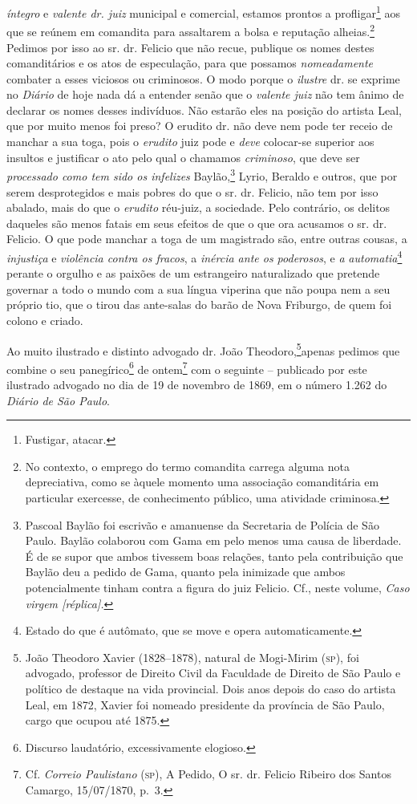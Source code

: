 \emph{íntegro} e \emph{valente dr. juiz} municipal e comercial, estamos
prontos a profligar\footnote{ Fustigar, atacar.} aos que se reúnem em
comandita para assaltarem a bolsa e reputação alheias.\footnote{ No
  contexto, o emprego do termo comandita carrega alguma nota
  depreciativa, como se àquele momento uma associação comanditária em
  particular exercesse, de conhecimento público, uma atividade
  criminosa.} Pedimos por isso ao sr. dr. Felicio que não recue,
publique os nomes destes comanditários e os atos de especulação, para
que possamos \emph{nomeadamente} combater a esses viciosos ou
criminosos. O modo porque o \emph{ilustre} dr. se exprime no
\emph{Diário} de hoje nada dá a entender senão que o \emph{valente juiz}
não tem ânimo de declarar os nomes desses indivíduos. Não estarão eles
na posição do artista Leal, que por muito menos foi preso? O erudito dr.
não deve nem pode ter receio de manchar a sua toga, pois o
\emph{erudito} juiz pode e \emph{deve} colocar-se superior aos insultos
e justificar o ato pelo qual o chamamos \emph{criminoso}, que deve ser
\emph{processado como tem sido os infelizes} Baylão,\footnote{ Pascoal
  Baylão foi escrivão e amanuense da Secretaria de Polícia de São Paulo.
  Baylão colaborou com Gama em pelo menos uma causa de liberdade. É de
  se supor que ambos tivessem boas relações, tanto pela contribuição que
  Baylão deu a pedido de Gama, quanto pela inimizade que ambos
  potencialmente tinham contra a figura do juiz Felicio. Cf., neste
  volume, \emph{Caso virgem {[}réplica{]}.}} Lyrio, Beraldo e outros,
que por serem desprotegidos e mais pobres do que o sr. dr. Felicio, não
tem por isso abalado, mais do que o \emph{erudito} réu-juiz, a
sociedade. Pelo contrário, os delitos daqueles são menos fatais em seus
efeitos de que o que ora acusamos o sr. dr. Felicio. O que pode manchar
a toga de um magistrado são, entre outras cousas, a \emph{injustiça} e
\emph{violência contra os fracos}, a \emph{inércia ante os poderosos}, e
\emph{a} \emph{automatia}\footnote{ Estado do que é autômato, que se
  move e opera automaticamente.} perante o orgulho e as paixões de um
estrangeiro naturalizado que pretende governar a todo o mundo com a sua
língua viperina que não poupa nem a seu próprio tio, que o tirou das
ante-salas do barão de Nova Friburgo, de quem foi colono e criado.

Ao muito ilustrado e distinto advogado dr. João Theodoro,\footnote{ João Theodoro Xavier (1828--1878), natural de Mogi-Mirim
  (\textsc{sp}), foi advogado, professor de Direito Civil da Faculdade de Direito
  de São Paulo e político de destaque na vida provincial. Dois anos
  depois do caso do artista Leal, em 1872, Xavier foi nomeado presidente
  da província de São Paulo, cargo que ocupou até 1875.}apenas pedimos
que combine o seu panegírico\footnote{ Discurso laudatório,
  excessivamente elogioso.} de ontem\footnote{ Cf. \emph{Correio
  Paulistano} (\textsc{sp}), A Pedido, O sr. dr. Felicio Ribeiro dos Santos
  Camargo, 15/07/1870, p.~3.} com o seguinte -- publicado por este
ilustrado advogado no dia de 19 de novembro de 1869, em o número 1.262
do \emph{Diário de São Paulo}.

